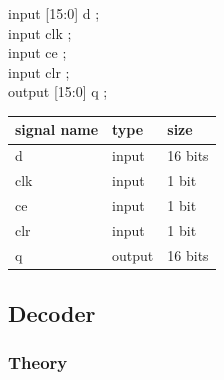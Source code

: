 \documentclass[11pt]{article}
\begin{document}
input  [15:0] d     ; \\
input         clk   ;   \\
input         ce    ; \\
input         clr   ; \\
output [15:0] q     ; \\

\begin{center}
\begin{tabular}{lll}
signal name & type & size\\
\hline
d & input & 16 bits\\
clk & input & 1 bit\\
ce & input & 1 bit\\
clr & input & 1 bit\\
q & output & 16 bits\\
\hline
\end{tabular}
\end{center}

\subsection{Decoder}
\label{sec:org5e2d5c1}
\subsubsection{Theory}
\label{sec:org55d233d}
\end{document}
